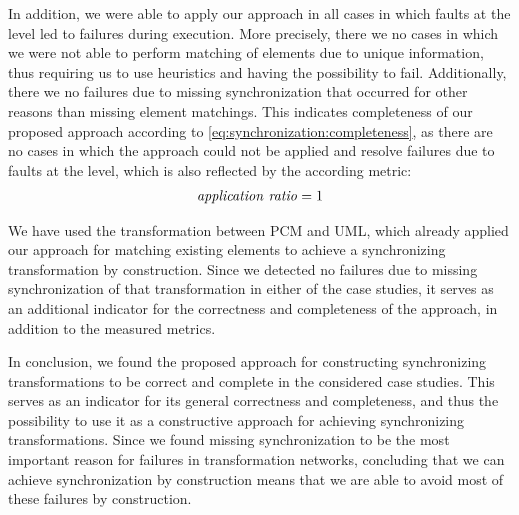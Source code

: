 In addition, we were able to apply our approach in all cases in which faults at the \leveltransformation level led to failures during execution.
More precisely, there we no cases in which we were not able to perform matching of elements due to unique information, thus requiring us to use heuristics and having the possibility to fail.
Additionally, there we no failures due to missing synchronization that occurred for other reasons than missing element matchings.
This indicates completeness of our proposed approach according to \autoref{eq:synchronization:completeness}, as there are no cases in which the approach could not be applied and resolve failures due to faults at the \leveltransformation level, which is also reflected by the according metric:
\begin{align*}
    \mathit{application\ ratio} = 1
\end{align*}

We have used the transformation between \gls{PCM} and \gls{UML}, which already applied our approach for matching existing elements to achieve a synchronizing transformation by construction.
Since we detected no failures due to missing synchronization of that transformation in either of the case studies, it serves as an additional indicator for the correctness and completeness of the approach, in addition to the measured metrics.

In conclusion, we found the proposed approach for constructing synchronizing transformations to be correct and complete in the considered case studies.
This serves as an indicator for its general correctness and completeness, and thus the possibility to use it as a constructive approach for achieving synchronizing transformations.
Since we found missing synchronization to be the most important reason for failures in transformation networks, concluding that we can achieve synchronization by construction means that we are able to avoid most of these failures by construction.


